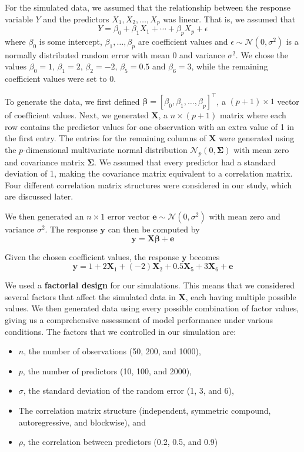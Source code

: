 \documentclass{article}
\begin{document}
For the simulated data, we assumed that the relationship between the response variable $Y$ and the predictors $X_1, X_2, \dotsc, X_p$ was linear. That is, we assumed that
\begin{equation}
	Y = \beta_0 + \beta_1 X_1 + \cdots + \beta_p X_p + \epsilon
\end{equation}
where $\beta_0$ is some intercept, $\beta_1, \dotsc, \beta_p$ are coefficient values and $\epsilon\sim \mathcal{N}(0, \sigma^2)$ is a normally distributed random error with mean 0 and variance $\sigma^2$. We chose the values $\beta_0 = 1$, $\beta_1 = 2$, $\beta_2 = -2$, $\beta_5=0.5$ and $\beta_6 = 3$, while the remaining coefficient values were set to 0.

To generate the data, we first defined $\bm{\beta} = [\beta_0, \beta_1, \dotsc, \beta_p]^\top$, a $(p + 1)\times 1$ vector of coefficient values. Next, we generated $\mathbf{X}$, a $n\times (p + 1)$ matrix where each row contains the predictor values for one observation with an extra value of 1 in the first entry. The entries for the remaining columns of $\mathbf{X}$ were generated using the $p$-dimensional multivariate normal distribution $\mathcal{N}_p(0, \mathbf{\Sigma})$ with mean zero and covariance matrix $\mathbf{\Sigma}$. We assumed that every predictor had a standard deviation of 1, making the covariance matrix equivalent to a correlation matrix. Four different correlation matrix structures were considered in our study, which are discussed later.

We then generated an $n\times 1$ error vector $\mathbf{e}\sim \mathcal{N}(0, \sigma^2)$ with mean zero and variance $\sigma^2$. The response $\mathbf{y}$ can then be computed by
\begin{equation}
	\mathbf{y} = \mathbf{X}\bm{\beta} + \mathbf{e}
\end{equation}

Given the chosen coefficient values, the response $\mathbf{y}$ becomes
\begin{equation}
	\mathbf{y} = 1 + 2\mathbf{X}_1 + (-2)\mathbf{X}_2 + 0.5\mathbf{X}_5 + 3\mathbf{X}_6 + \mathbf{e}
\end{equation}


We used a \textbf{factorial design} for our simulations. This means that we considered several factors that affect the simulated data in $\mathbf{X}$, each having multiple possible values. We then generated data using every possible combination of factor values, giving us a comprehensive assessment of model performance under various conditions. The factors that we controlled in our simulation are:
\begin{itemize}
	\item $n$, the number of observations (50, 200, and 1000),
	\item $p$, the number of predictors (10, 100, and 2000),
	\item $\sigma$, the standard deviation of the random error (1, 3, and 6),
	\item The correlation matrix structure (independent, symmetric compound, autoregressive, and blockwise), and
	\item $\rho$, the correlation between predictors (0.2, 0.5, and 0.9)
\end{itemize}
\end{document}
